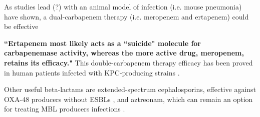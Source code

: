 \documentclass[11pt]{report}
\begin{document}
As studies lead (?) with an animal model of infection (i.e. mouse pneumonia) have shown, a dual-carbapenem therapy (i.e. meropenem and ertapenem) could be effective \cite{wiskirchen2014vivo}

\textbf{``Ertapenem most likely acts as a ``suicide" molecule for carbapenemase activity, whereas the more active drug, meropenem, retains its efficacy."}
This double-carbapenem therapy efficacy has been proved in human patients infected with KPC-producing strains \cite{giamarellou2013effectiveness}. 

Other useful beta-lactams are extended-spectrum cephalosporins, effective against OXA-48 producers without ESBLs \cite{mimoz2012broad}, and aztreonam, which can remain an option for treating MBL producers infections \cite{nordmann2011emerging}.












\end{document}
